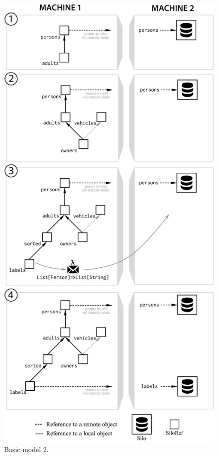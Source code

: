 \documentclass[preprint]{sigplanconf}
\theoremstyle{definition}
\theoremstyle{definition}
\begin{document}
\begin{figure}[t!]
\centering\includegraphics[width=\columnwidth]{bigger-dag.pdf}
\caption{Basic model 2.}\label{fig:bigger-dag}
\end{figure}
\end{document}
